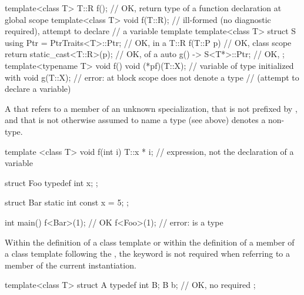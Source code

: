 \begin{example}
\begin{codeblock}
template<class T> T::R f();             // OK, return type of a function declaration at global scope
template<class T> void f(T::R);         // ill-formed (no diagnostic required), attempt to declare
                                        // a  variable template
template<class T> struct S {
  using Ptr = PtrTraits<T>::Ptr;        // OK, in a 
  T::R f(T::P p) {                      // OK, class scope
    return static_cast<T::R>(p);        // OK,  of a 
  }
  auto g() -> S<T*>::Ptr;               // OK, 
};
template<typename T> void f() {
  void (*pf)(T::X);                     // variable  of type  initialized with 
  void g(T::X);                         // error:  at block scope does not denote a type
                                        // (attempt to declare a  variable)
}
\end{codeblock}
\end{example}

\pnum
A  that refers to a member of an unknown specialization,
that is not prefixed by ,
and that is not otherwise assumed to name a type (see above)
denotes a non-type.
\begin{example}

\begin{codeblock}
template <class T> void f(int i) {
  T::x * i;         // expression, not the declaration of a variable 
}

struct Foo {
  typedef int x;
};

struct Bar {
  static int const x = 5;
};

int main() {
  f<Bar>(1);        // OK
  f<Foo>(1);        // error:  is a type
}
\end{codeblock}
\end{example}

\pnum
Within the definition of a class template or within the definition of a
member of a class template following the , the keyword
is not required when referring to
a member of the current instantiation.
\begin{example}
\begin{codeblock}
template<class T> struct A {
  typedef int B;
  B b;              // OK, no  required
};
\end{codeblock}
\end{example}

